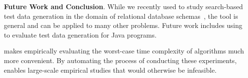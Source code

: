 {\bf Future Work and Conclusion}.
  While we recently used \toolname to study search-based test data
  generation in the domain of relational database
  schemas~\cite{kinneer2015}, the tool is
  general and can be applied to many other problems. Future work
  includes using \toolname to evaluate test data generation for Java
  programs.


  \toolname makes empirically evaluating the worst-case time
  complexity of algorithms much more convenient. By automating the
  process of conducting these experiments, \toolname enables large-scale
  empirical studies that would otherwise be infeasible.
